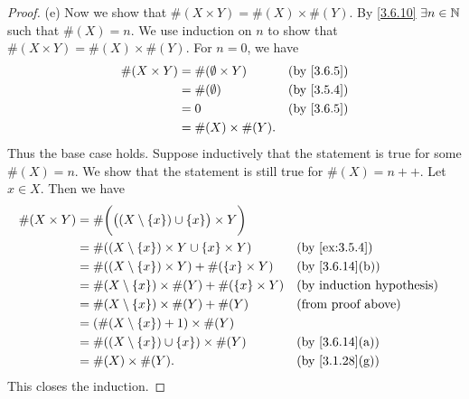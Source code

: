 \begin{proof}{(e)}
  Now we show that \(\#(X \times Y) = \#(X) \times \#(Y)\).
  By \cref{3.6.10} \(\exists n \in \mathbb{N}\) such that \(\#(X) = n\).
  We use induction on \(n\) to show that \(\#(X \times Y) = \#(X) \times \#(Y)\).
  For \(n = 0\), we have
  \begin{align*}
    \#(X \times Y) & = \#(\emptyset \times Y) &  & \by{3.6.5} \\
                   & = \#(\emptyset)          &  & \by{3.5.4} \\
                   & = 0                      &  & \by{3.6.5} \\
                   & = \#(X) \times \#(Y).
  \end{align*}
  Thus the base case holds.
  Suppose inductively that the statement is true for some \(\#(X) = n\).
  We show that the statement is still true for \(\#(X) = n++\).
  Let \(x \in X\).
  Then we have
  \begin{align*}
    \#(X \times Y) & = \#\bigg(\big((X \setminus \set{x}) \cup \set{x}\big) \times Y\bigg)                                   \\
                   & = \#((X \setminus \set{x}) \times Y \cup \set{x} \times Y)            &  & \by{ex:3.5.4}                \\
                   & = \#((X \setminus \set{x}) \times Y) + \#(\set{x} \times Y)           &  & \text{(by \cref{3.6.14}(b))} \\
                   & = \#(X \setminus \set{x}) \times \#(Y) + \#(\set{x} \times Y)         &  & \byIH                        \\
                   & = \#(X \setminus \set{x}) \times \#(Y) + \#(Y)                        &  & \text{(from proof above)}    \\
                   & = (\#(X \setminus \set{x}) + 1) \times \#(Y)                                                            \\
                   & = \#((X \setminus \set{x}) \cup \set{x}) \times \#(Y)                 &  & \text{(by \cref{3.6.14}(a))} \\
                   & = \#(X) \times \#(Y).                                                 &  & \text{(by \cref{3.1.28}(g))}
  \end{align*}
  This closes the induction.
\end{proof}

